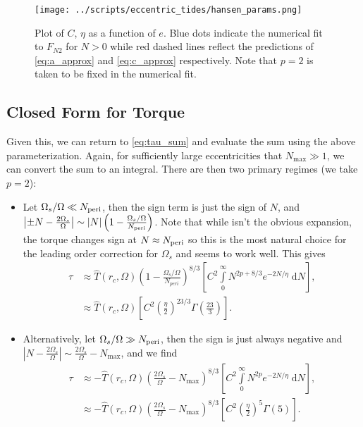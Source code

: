 \documentclass[
        fleqn,
        usenatbib,
        referee,
    ]{mnras}
\newcommand*{\abs}[1]{\left|#1\right|}
\newcommand*{\p}[1]{\left(#1\right)}
\newcommand*{\s}[1]{\left[#1\right]}
\begin{document}
\begin{figure}
    \centering
    \texttt{[image: ../scripts/eccentric\_tides/hansen\_params.png]}
    \caption{Plot of $C$, $\eta$ as a function of $e$. Blue dots indicate the
    numerical fit to $F_{N2}$ for $N > 0$ while red dashed lines reflect the
    predictions of \autoref{eq:a_approx} and \autoref{eq:c_approx} respectively.
    Note that $p = 2$ is taken to be fixed in the numerical
    fit.}\label{fig:hansen_params}
\end{figure}

\subsection{Closed Form for Torque}

Given this, we can return to \autoref{eq:tau_sum} and evaluate the sum using the
above parameterization. Again, for sufficiently large eccentricities that
$N_{\max} \gg 1$, we can convert the sum to an integral. There are then two
primary regimes (we take $p = 2$):
\begin{itemize}
    \item Let $\Omega_s/\Omega \ll N_{\rm peri}$, then the sign term is just the
        sign of $N$, and $\abs{\pm N - \frac{2\Omega_s}{\Omega}} \sim
        \abs{N}\p{1 - \frac{\Omega_s/\Omega}{N_{\rm peri}}}$. Note that while
        isn't the obvious expansion, the torque changes sign at $N
        \approx N_{\rm peri}$ so this is the most natural choice for the leading
        order correction for $\Omega_s$ and seems to work well. This gives
        \begin{align}
            \tau &\approx \hat{T}(r_c, \Omega)
                \p{1 - \frac{\Omega_s/\Omega}{N_{peri}}}^{8/3}
            \s{
                C^2\int\limits_0^{\infty}
                    N^{2p + 8/3}e^{-2N/\eta}\;\mathrm{d}N},\\
                &\approx \hat{T}(r_c, \Omega)\s{
                    C^2 \p{\frac{\eta}{2}}^{23/3} \Gamma\p{\frac{23}{3}}}.
                    \label{eq:tau_approx_1}
        \end{align}

    \item Alternatively, let $\Omega_s/\Omega \gg N_{\rm peri}$, then the sign
        is just always negative and $\abs{N - \frac{2\Omega_s}{\Omega}} \sim
        \frac{2\Omega_s}{\Omega} - N_{\max}$, and we find
        \begin{align}
            \tau &\approx -\hat{T}(r_c, \Omega) \p{\frac{2\Omega_s}{\Omega} -
                    N_{\max}}^{8/3}
                \s{C^2\int\limits_0^{\infty}
                    N^{2p}e^{-2N/\eta}\;\mathrm{d}N},\\
                &\approx -\hat{T}(r_c, \Omega)
                    \p{\frac{2\Omega_s}{\Omega} - N_{\max}}^{8/3}\s{
                        C^2 \p{\frac{\eta}{2}}^{5} \Gamma\p{5}}.
                    \label{eq:tau_approx_2}
        \end{align}
\end{itemize}
\end{document}
